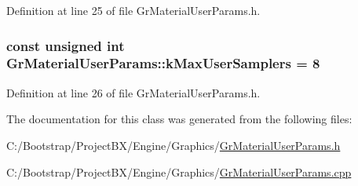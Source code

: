 Definition at line 25 of file GrMaterialUserParams.h.\hypertarget{class_gr_material_user_params_7f9d77d332f6feaa280819c24cb70daf}{
\subsubsection[{kMaxUserSamplers}]{\setlength{\rightskip}{0pt plus 5cm}const unsigned int {\bf GrMaterialUserParams::kMaxUserSamplers} = 8}}
\label{class_gr_material_user_params_7f9d77d332f6feaa280819c24cb70daf}




Definition at line 26 of file GrMaterialUserParams.h.

The documentation for this class was generated from the following files:\begin{CompactItemize}
\item 
C:/Bootstrap/ProjectBX/Engine/Graphics/\hyperlink{_gr_material_user_params_8h}{GrMaterialUserParams.h}\item 
C:/Bootstrap/ProjectBX/Engine/Graphics/\hyperlink{_gr_material_user_params_8cpp}{GrMaterialUserParams.cpp}\end{CompactItemize}
